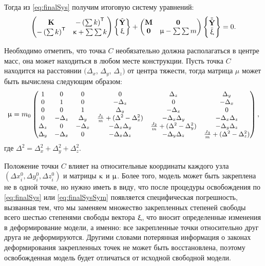 Тогда из \eqref{eq:finalSys} получим итоговую систему уравнений:
\begin{equation}
	\begin{pmatrix}
		\mathbf{K} & -\left( \sum k \right) ^ \mathsf{T} \\
		 -\left( \sum k \right) ^ \mathsf{T} & \upkappa + \sum \sum k
	\end{pmatrix}
	\begin{Bmatrix}
		\tilde{\mathbf{Y}} \\
		\upxi
	\end{Bmatrix}
	+
	\begin{pmatrix}
		\mathbf{M} & \mathbf{0} \\
		\mathbf{0} & \upmu - \sum \sum m
	\end{pmatrix}
		\begin{Bmatrix}
		\ddot{\tilde{\mathbf{Y}}} \\
		\ddot{\upxi}
	\end{Bmatrix}
	= 0.
	\label{eq:finalSysSym}
\end{equation}

Необходимо отметить, что точка $ C $ необязательно должна располагаться в центре масс, она может находиться в любом месте конструкции. Пусть точка $ C $ находится на расстоянии $ (\Delta_x$, $\Delta_y$, $\Delta_z) $ от центра тяжести, тогда матрица $ \mu $ может быть вычислена следующим образом:
\begin{equation}
	\small
	\mathbf{\upmu} = m_0
	\begin{pmatrix}
		1 & 0 & 0 & 0 & \Delta_z & \Delta_y \\
		0 & 1 & 0 & -\Delta_z & 0 & -\Delta_x \\
		0 & 0 & 1 & \Delta_y & -\Delta_x & 0 \\
		0 & -\Delta_z & \Delta_y & \frac{J_1}{m} + (\Delta^2 - \Delta_x^2) & -\Delta_x \Delta_y & -\Delta_x \Delta_z \\
		\Delta_z & 0 & -\Delta_x & -\Delta_x \Delta_y & \frac{J_2}{m} + (\Delta^2 - \Delta_y^2) & -\Delta_y \Delta_z \\
		\Delta_y & - \Delta_x & 0 & -\Delta_x \Delta_z & -\Delta_y \Delta_z & \frac{J_3}{m} + (\Delta^2 - \Delta_z^2)
	\end{pmatrix},
\end{equation}
где $ \Delta^2 = \Delta_x^2 + \Delta_y^2 + \Delta_z^2 $.

Положение точки $ C $ влияет на относительные координаты каждого узла $ (\Delta x^0_i, \Delta y^0_i, \Delta z^0_i) $ и матрицы $ \mathbf{\upkappa} $ и $ \mathbf{\upmu} $. Более того, модель может быть закреплена не в одной точке, но нужно иметь в виду, что после процедуры освобождения по \eqref{eq:finalSys} или \eqref{eq:finalSysSym} появляется специфическая погрешность, вызванная тем, что мы заменяем множество закрепленных степеней свободы всего шестью степенями свободы вектора $ \mathbf{\upxi} $, что вносит определенные изменения в деформирование модели, а именно: все закрепленные точки относительно друг друга не деформируются. Другими словами потерянная информация о законах деформирования закрепленных точек не может быть восстановлена, поэтому освобожденная модель будет отличаться от исходной свободной модели.

